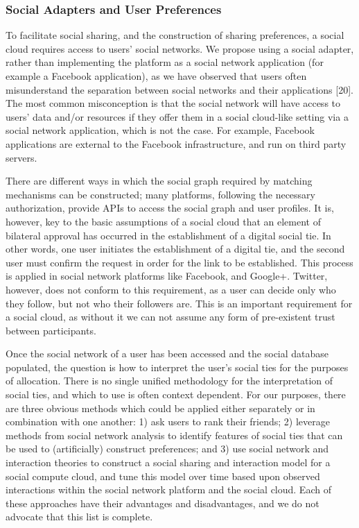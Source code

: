 \documentclass[a4paper,12pt]{article}
\begin{document}
	\subsubsection{Social Adapters and User Preferences}
To facilitate social sharing, and the construction of sharing preferences, a social cloud requires access to users’
social networks. We propose using a social adapter,
rather than implementing the platform as a social network application (for example a Facebook application),
as we have observed that users often misunderstand the
separation between social networks and their applications [20]. The most common misconception is that the
social network will have access to users’ data and/or
resources if they offer them in a social cloud-like setting
via a social network application, which is not the case.
For example, Facebook applications are external to the
Facebook infrastructure, and run on third party servers.
	\par There are different ways in which the social graph
required by matching mechanisms can be constructed; many
platforms, following the necessary authorization, provide
APIs to access the social graph and user profiles. It is, however, key to the basic assumptions of a social cloud that an
element of bilateral approval has occurred in the establishment of a digital social tie. In other words, one user initiates
the establishment of a digital tie, and the second user must
confirm the request in order for the link to be established.
This process is applied in social network platforms like Facebook, and Google+. Twitter, however, does not conform to
this requirement, as a user can decide only who they follow,
but not who their followers are. This is an important requirement for a social cloud, as without it we can not assume any
form of pre-existent trust between participants.
	\par Once the social network of a user has been accessed and
the social database populated, the question is how to interpret the user’s social ties for the purposes of allocation.
There is no single unified methodology for the interpretation of social ties, and which to use is often context dependent. For our purposes, there are three obvious methods
which could be applied either separately or in combination
with one another: 1) ask users to rank their friends; 2) leverage methods from social network analysis to identify features of social ties that can be used to (artificially) construct
preferences; and 3) use social network and interaction theories to construct a social sharing and interaction model for a
social compute cloud, and tune this model over time based
upon observed interactions within the social network platform and the social cloud. Each of these approaches have
their advantages and disadvantages, and we do not advocate that this list is complete.
\end{document}
